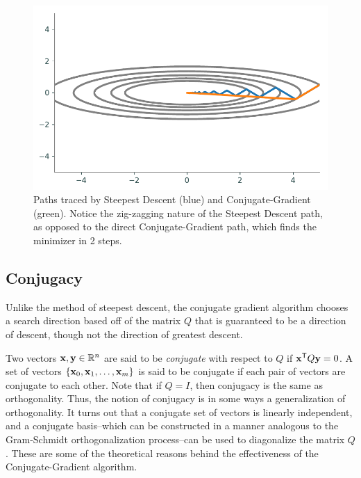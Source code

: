 %
%

\begin{figure}
\centering
\includegraphics[width=.7\textwidth]{figures/steepVsConj.pdf}
\caption{Paths traced by Steepest Descent (blue) and Conjugate-Gradient (green). Notice the
zig-zagging nature of the Steepest Descent path, as opposed to the direct Conjugate-Gradient path,
which finds the minimizer in 2 steps.}
\label{basis:steepVsConj}
\end{figure}

\subsection*{Conjugacy} %
Unlike the method of steepest descent, the conjugate gradient algorithm chooses a search direction based off of the matrix $Q$ that is guaranteed to be a direction of descent, though not the direction of greatest descent.

Two vectors $\mathbf{x},\mathbf{y} \in \mathbb{R}^n$ are said to be \emph{conjugate}
with respect to $Q$ if $\mathbf{x}^{\mathsf T} Q\mathbf{y} = 0$.
A set of vectors $\{\mathbf{x}_0, \mathbf{x}_1, \ldots, \mathbf{x}_m\}$ is said to be conjugate if each pair of vectors are conjugate to each other.
Note that if $Q = I$, then conjugacy is the same as orthogonality.
Thus, the notion of conjugacy is in some ways a generalization
of orthogonality.
It turns out that a conjugate set of vectors is linearly independent, and a conjugate basis--which can be constructed in a manner analogous to the Gram-Schmidt orthogonalization process--can be used to diagonalize the matrix $Q$.
These are some of the theoretical reasons behind the effectiveness of the Conjugate-Gradient algorithm.

